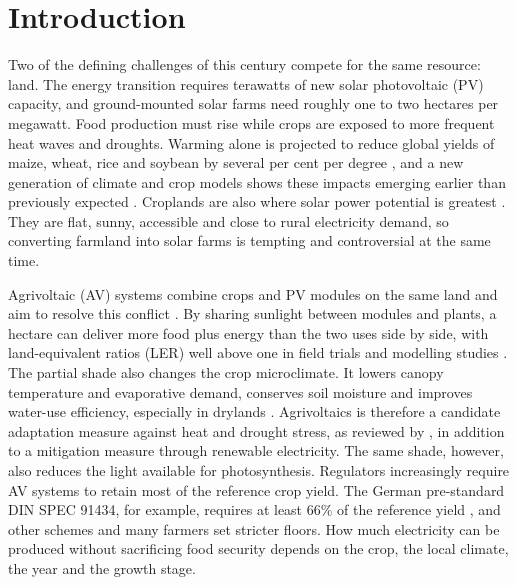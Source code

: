 \section{Introduction}\label{sec:intro}

Two of the defining challenges of this century compete for the same resource: land. The energy transition requires terawatts of new solar photovoltaic (PV) capacity, and ground-mounted solar farms need roughly one to two hectares per megawatt. Food production must rise while crops are exposed to more frequent heat waves and droughts. Warming alone is projected to reduce global yields of maize, wheat, rice and soybean by several per cent per degree \citep{zhao2017,ipcc2021}, and a new generation of climate and crop models shows these impacts emerging earlier than previously expected \citep{jagermeyr2021}. Croplands are also where solar power potential is greatest \citep{adeh2019}. They are flat, sunny, accessible and close to rural electricity demand, so converting farmland into solar farms is tempting and controversial at the same time.

Agrivoltaic (AV) systems combine crops and PV modules on the same land and aim to resolve this conflict \citep{dupraz2011,dinesh2016,weselek2019}. By sharing sunlight between modules and plants, a hectare can deliver more food plus energy than the two uses side by side, with land-equivalent ratios (LER) well above one in field trials and modelling studies \citep{dupraz2011,amaducci2018,valle2017,trommsdorff2021}. The partial shade also changes the crop microclimate. It lowers canopy temperature and evaporative demand, conserves soil moisture and improves water-use efficiency, especially in drylands \citep{marrou2013,adeh2018,barron2019,elamri2018,weselek2021}. Agrivoltaics is therefore a candidate adaptation measure against heat and drought stress, as reviewed by \citet{mamun2022}, in addition to a mitigation measure through renewable electricity. The same shade, however, also reduces the light available for photosynthesis. Regulators increasingly require AV systems to retain most of the reference crop yield. The German pre-standard DIN SPEC 91434, for example, requires at least 66\% of the reference yield \citep{din2021}, and other schemes and many farmers set stricter floors. How much electricity can be produced without sacrificing food security depends on the crop, the local climate, the year and the growth stage.

